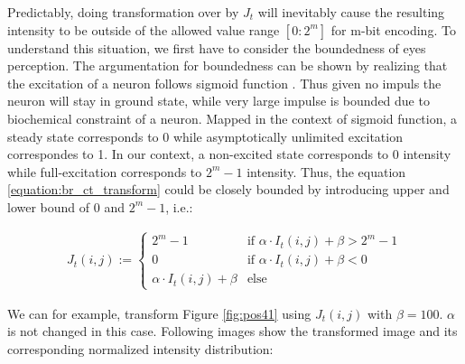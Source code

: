 \documentclass[pdftex,12pt,a4paper]{report}
\begin{document}
Predictably, doing transformation over by $J_t$ will inevitably cause the resulting intensity to be outside of the allowed value range $[0:2^m]$ for m-bit encoding. To understand this situation, we first have to consider the boundedness of eyes perception. The argumentation for boundedness can be shown by realizing that the excitation of a neuron follows sigmoid function \cite{gazzaniga2004cognitive}. Thus given no impuls the neuron will stay in ground state, while very large impulse is bounded due to biochemical constraint of a neuron. Mapped in the context of sigmoid function, a steady state corresponds to 0 while asymptotically unlimited excitation correspondes to 1. In our context, a non-excited state corresponds to 0 intensity while full-excitation corresponds to $2^m - 1$ intensity. Thus, the equation \ref{equation:br_ct_transform} could be closely bounded by introducing upper and lower bound of $0$ and $2^m - 1$, i.e.:

\begin{gather*}
J_t(i, j) :=
\begin{cases}
  2^m - 1 & \text{if } \alpha \cdot I_t(i, j) + \beta > 2^m - 1\\
  0 & \text{if } \alpha \cdot I_t(i, j) + \beta < 0\\
  \alpha \cdot I_t(i, j) + \beta & \text{else}
\end{cases}
\end{gather*}

We can for example, transform Figure \ref{fig:pos41} using $J_t(i, j)$ with $\beta=100$. $\alpha$ is not changed in this case. Following images show the transformed image and its corresponding normalized intensity distribution:
\end{document}
